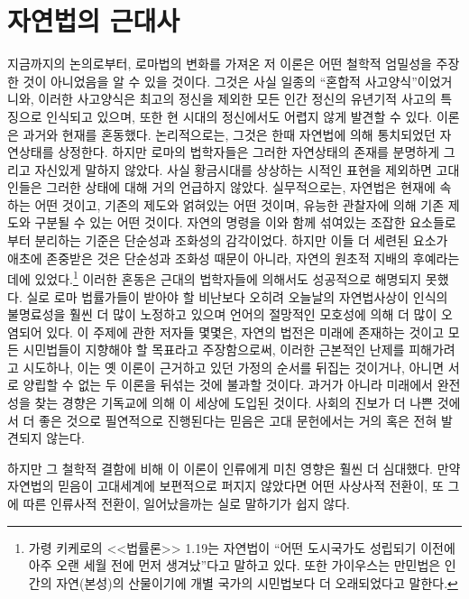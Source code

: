 \chapter{자연법의 근대사}

지금까지의 논의로부터, 로마법의 변화를 가져온 저 이론은 어떤 철학적 엄밀성을
주장한 것이 아니었음을 알 수 있을 것이다.
그것은 사실 일종의 ``혼합적 사고양식''이었거니와,
이러한 사고양식은 최고의 정신을 제외한 모든 인간 정신의 유년기적 사고의
특징으로 인식되고 있으며, 또한 현 시대의 정신에서도 어렵지 않게
발견할 수 있다.
 이론은 과거와 현재를 혼동했다.
논리적으로는, 그것은 한때 자연법에 의해 통치되었던 자연상태를 상정한다.
하지만 로마의 법학자들은 그러한 자연상태의 존재를 분명하게 그리고
자신있게 말하지 않았다. 사실 황금시대를 상상하는 시적인 표현을
제외하면 고대인들은 그러한 상태에 대해 거의 언급하지 않았다.
실무적으로는, 자연법은 현재에 속하는 어떤 것이고,
기존의 제도와 얽혀있는 어떤 것이며, 유능한 관찰자에 의해
기존 제도와 구분될 수 있는 어떤 것이다.
자연의 명령을 이와 함께 섞여있는 조잡한 요소들로부터 분리하는 기준은
단순성과 조화성의 감각이었다.
하지만 이들 더 세련된 요소가 애초에 존중받은 것은
단순성과 조화성 때문이 아니라,
자연의 원초적 지배의 후예라는 데에 있었다.\footnote{%
  가령 키케로의 <<법률론>> 1.19는 자연법이
  ``어떤 도시국가도 성립되기 이전에 아주 오랜 세월 전에 먼저
  생겨났''다고 말하고 있다.
  또한 가이우스는 만민법은 인간의 자연(본성)의 산물이기에
  개별 국가의 시민법보다 더 오래되었다고 말한다.
   }
이러한 혼동은 근대의 법학자들에 의해서도 성공적으로 해명되지 못했다.
실로
로마 법률가들이 받아야 할 비난보다 오히려
오늘날의 자연법사상이 인식의 불명료성을 훨씬 더 많이 노정하고 있으며
언어의 절망적인 모호성에 의해 더 많이 오염되어 있다.
이 주제에 관한 저자들 몇몇은, 자연의 법전은 미래에 존재하는 것이고
모든 시민법들이 지향해야 할 목표라고 주장함으로써,
이러한 근본적인 난제를 피해가려고 시도하나,
이는 옛 이론이 근거하고 있던 가정의 순서를 뒤집는 것이거나,
아니면 서로 양립할 수 없는 두 이론을 뒤섞는 것에 불과할 것이다.
과거가 아니라 미래에서 완전성을 찾는 경향은 기독교에 의해
이 세상에 도입된 것이다.
사회의 진보가 더 나쁜 것에서 더 좋은 것으로 필연적으로 진행된다는 믿음은
고대 문헌에서는 거의 혹은 전혀 발견되지 않는다.

하지만 그 철학적 결함에 비해 이 이론이 인류에게 미친 영향은 훨씬 더 심대했다.
만약 자연법의 믿음이 고대세계에 보편적으로 퍼지지 않았다면
어떤 사상사적 전환이, 또 그에 따른 인류사적 전환이, 일어났을까는
실로 말하기가 쉽지 않다.

